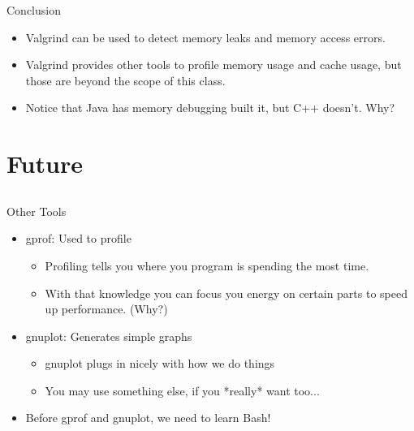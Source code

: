 \documentclass{beamer}
\begin{document}
\begin{frame}{Conclusion}
\begin{itemize}
\item Valgrind can be used to detect memory leaks and memory access errors.
\item Valgrind provides other tools to profile memory usage and cache usage, but those are beyond the scope of this class.
\item Notice that Java has memory debugging built it, but C++ doesn't.  Why?
\end{itemize}
\end{frame}

\section{Future}
\subsection{}

\begin{frame}{Other Tools}
\begin{itemize}
\item gprof: Used to profile
\begin{itemize}
\item Profiling tells you where you program is spending the most time.
\item With that knowledge you can focus you energy on certain parts to speed up performance.  (Why?)
\end{itemize}
\item gnuplot: Generates simple graphs
\begin{itemize}
\item gnuplot plugs in nicely with how we do things
\item You may use something else, if you *really* want too...
\end{itemize}
\item Before gprof and gnuplot, we need to learn Bash!
\end{itemize}
\end{frame}
\end{document}

